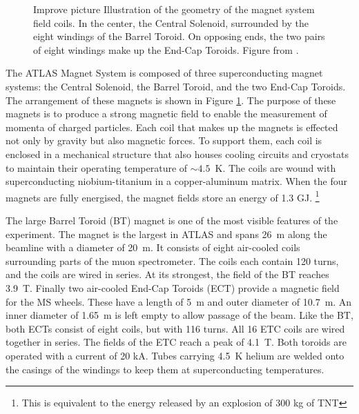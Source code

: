 \begin{figure}[h!]
\captionsetup[subfigure]{position=b}
\centering
{}
\caption{{\color{red} Improve picture} Illustration of the geometry of the magnet system field coils. In the center, the Central Solenoid, surrounded by the eight windings of the Barrel Toroid. On opposing ends, the two pairs of eight windings make up the End-Cap Toroids. Figure from \cite{magnetTdr}.}
\label{fig:atlasMagnets}
\end{figure}

The ATLAS Magnet System is composed of three superconducting magnet systems: the Central Solenoid, the Barrel Toroid, and the two End-Cap Toroids.
The arrangement of these magnets is shown in Figure \ref{fig:atlasMagnets}.
The purpose of these magnets is to produce a strong magnetic field to enable the measurement of momenta of charged particles.
Each coil that makes up the magnets is effected not only by gravity but also magnetic forces.
To support them, each coil is enclosed in a mechanical structure that also houses cooling circuits and cryostats to maintain their operating temperature of $\sim4.5$~K.
The coils are wound with superconducting niobium-titanium in a copper-aluminum matrix.
When the four magnets are fully energised, the magnet fields store an energy of 1.3 GJ. \footnote{This is equivalent to the energy released by an explosion of 300 kg of TNT}

The large Barrel Toroid (BT) magnet is one of the most visible features of the experiment.
The magnet is the largest in ATLAS and spans 26~m along the beamline with a diameter of 20~m. 
It consists of eight air-cooled coils surrounding parts of the muon spectrometer.
The coils each contain 120 turns, and the coils are wired in series.
At its strongest, the field of the BT reaches 3.9~T.
Finally two air-cooled End-Cap Toroids (ECT) provide a magnetic field for the MS wheels.
These have a length of 5~m and outer diameter of 10.7~m. An inner diameter of 1.65~m is left empty to allow passage of the beam.
Like the BT, both ECTs consist of eight coils, but with 116 turns.
All 16 ETC coils are wired together in series.
The fields of the ETC reach a peak of 4.1~T.
Both toroids are operated with a current of 20 kA.
Tubes carrying 4.5~K helium are welded onto the casings of the windings to keep them at superconducting temperatures.

